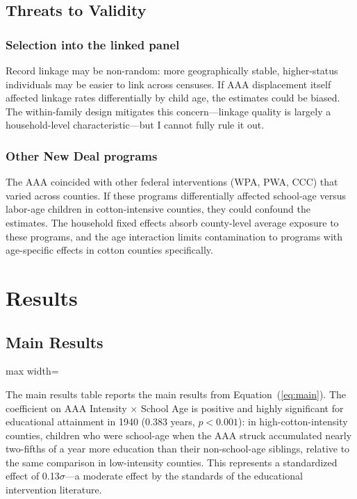 \documentclass[12pt]{article}
\begin{document}
\subsection{Threats to Validity}

\subsubsection*{Selection into the linked panel} Record linkage may be non-random: more geographically stable, higher-status individuals may be easier to link across censuses. If AAA displacement itself affected linkage rates differentially by child age, the estimates could be biased. The within-family design mitigates this concern---linkage quality is largely a household-level characteristic---but I cannot fully rule it out.

\subsubsection*{Other New Deal programs} The AAA coincided with other federal interventions (WPA, PWA, CCC) that varied across counties. If these programs differentially affected school-age versus labor-age children in cotton-intensive counties, they could confound the estimates. The household fixed effects absorb county-level average exposure to these programs, and the age interaction limits contamination to programs with age-specific effects in cotton counties specifically.


\section{Results}

\subsection{Main Results}

\begin{table}[H]
\caption{Main Results: Sibling Fixed Effects}\label{tab:main}
\begin{adjustbox}{max width=\textwidth}

\end{adjustbox}
\end{table}

The main results table reports the main results from Equation~(\ref{eq:main}). The coefficient on AAA Intensity $\times$ School Age is positive and highly significant for educational attainment in 1940 (0.383 years, $p < 0.001$): in high-cotton-intensity counties, children who were school-age when the AAA struck accumulated nearly two-fifths of a year more education than their non-school-age siblings, relative to the same comparison in low-intensity counties. This represents a standardized effect of 0.13$\sigma$---a moderate effect by the standards of the educational intervention literature.
\end{document}
